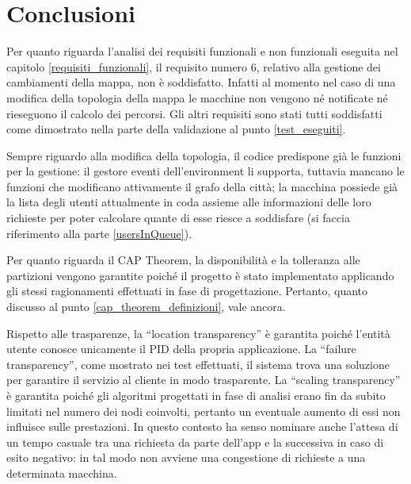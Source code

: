 
\chapter{Conclusioni} \label{conclusioni_progetto}

Per quanto riguarda l'analisi dei requisiti funzionali e non funzionali eseguita nel capitolo \ref{requisiti_funzionali}, il requisito numero 6, relativo alla gestione dei cambiamenti della mappa, non è soddisfatto. Infatti al momento nel caso di una modifica della topologia della mappa le macchine non vengono né notificate né rieseguono il calcolo dei percorsi. Gli altri requisiti sono stati tutti soddisfatti come dimostrato nella parte della validazione al punto \ref{test_eseguiti}.

Sempre riguardo alla modifica della topologia, il codice predispone già le funzioni per la gestione: il gestore eventi dell'environment li supporta, tuttavia mancano le funzioni che modificano attivamente il grafo della città; la macchina possiede già la lista degli utenti attualmente in coda assieme alle informazioni delle loro richieste per poter calcolare quante di esse riesce a soddisfare (si faccia riferimento alla parte \ref{usersInQueue}).

Per quanto riguarda il CAP Theorem, la disponibilità e la tolleranza alle partizioni vengono garantite poiché il progetto è stato implementato applicando gli stessi ragionamenti effettuati in fase di progettazione. Pertanto, quanto discusso al punto \ref{cap_theorem_definizioni}, vale ancora.

Rispetto alle trasparenze, la ``location transparency'' è garantita poiché l'entità utente conosce unicamente il PID della propria applicazione. La ``failure transparency'', come mostrato nei test effettuati, il sistema trova una soluzione per garantire il servizio al cliente in modo trasparente. La ``scaling transparency'' è garantita poiché gli algoritmi progettati in fase di analisi erano fin da subito limitati nel numero dei nodi coinvolti, pertanto un eventuale aumento di essi non influisce sulle prestazioni. In questo contesto ha senso nominare anche l'attesa di un tempo casuale tra una richiesta da parte dell'app e la successiva in caso di esito negativo: in tal modo non avviene una congestione di richieste a una determinata macchina.


